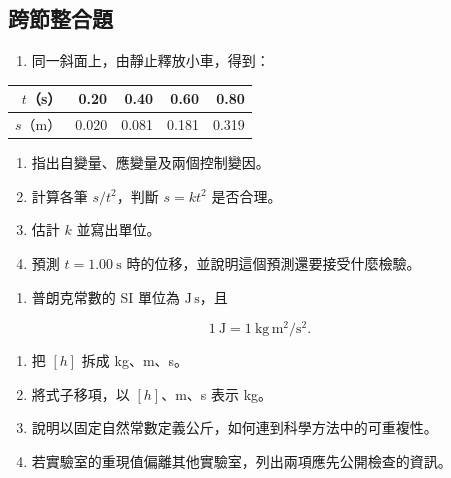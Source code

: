 \documentclass[11pt,a4paper]{article}
\newcounter{none}
\providecommand{\tightlist}{%
  \setlength{\itemsep}{0pt}\setlength{\parskip}{0pt}}
\begin{document}
\subsection{跨節整合題}\label{ux8de8ux7bc0ux6574ux5408ux984c}

\begin{enumerate}
\def\labelenumi{\arabic{enumi}.}
\setcounter{enumi}{12}
\tightlist
\item
  同一斜面上，由靜止釋放小車，得到：
\end{enumerate}

{\def\LTcaptype{none} %
\begin{longtable}[]{@{}rrrrr@{}}
\toprule\noalign{}
\(t\)（s） & 0.20 & 0.40 & 0.60 & 0.80 \\
\midrule\noalign{}
\endhead
\bottomrule\noalign{}
\endlastfoot
\(s\)（m） & 0.020 & 0.081 & 0.181 & 0.319 \\
\end{longtable}
}

\begin{enumerate}
\def\labelenumi{(\arabic{enumi})}
\tightlist
\item
  指出自變量、應變量及兩個控制變因。\\
\item
  計算各筆 \(s/t^2\)，判斷 \(s=kt^2\) 是否合理。\\
\item
  估計 \(k\) 並寫出單位。\\
\item
  預測 \(t=1.00\ \mathrm s\) 時的位移，並說明這個預測還要接受什麼檢驗。
\end{enumerate}

\begin{enumerate}
\def\labelenumi{\arabic{enumi}.}
\setcounter{enumi}{13}
\tightlist
\item
  普朗克常數的 SI 單位為 \(\mathrm{J\,s}\)，且
\end{enumerate}

\[
1\ \mathrm J=1\ \mathrm{kg\,m^2/s^2}.
\]

\begin{enumerate}
\def\labelenumi{(\arabic{enumi})}
\tightlist
\item
  把 \([h]\) 拆成 kg、m、s。\\
\item
  將式子移項，以 \([h]\)、m、s 表示 kg。\\
\item
  說明以固定自然常數定義公斤，如何連到科學方法中的可重複性。\\
\item
  若實驗室的重現值偏離其他實驗室，列出兩項應先公開檢查的資訊。
\end{enumerate}
\end{document}
